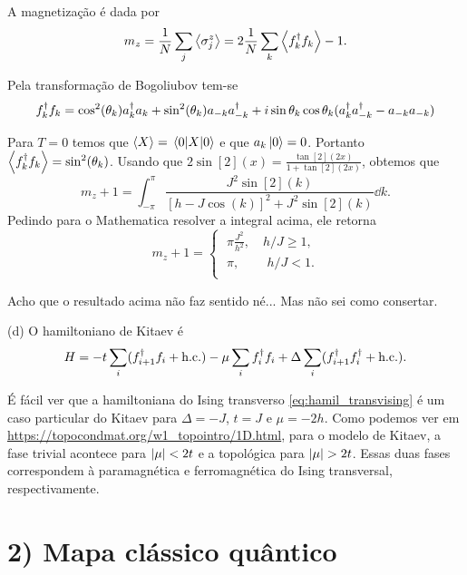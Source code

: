 \documentclass[a4paper,10pt]{article}
\begin{document}
\n

A magnetização é dada por
$$
m_z = \frac{1}{N} \sum_{j} \ev{\s_j^z} = 2 \frac{1}{N}\sum_{k} \ev{f_k^\d f_k} - 1.
$$

Pela transformação de Bogoliubov tem-se
$$
f_k^\dagger f_k = \cos[2](\theta_k) a_k^\dagger a_k + \sin[2](\theta_k) a_{-k}a_{-k}^\dagger
+ i \sin\theta_k \cos\theta_k (a_{k}^\dagger a_{-k}^\dagger - a_{-k} a_{-k})
$$

Para $T = 0$ temos que $\ev{X} = \ev{X}{0}$ e que $a_k \ket{0} = 0$. Portanto $\ev{f_k^\d f_k} = \sin[2](\theta_k)$. Usando que $2 \sin[2](x) = \frac{\tan[2](2x)}{1 + \tan[2](2x)}$, obtemos que
$$
m_z + 1 = \int_{-\pi}^{\pi} \frac{J^2 \sin[2](k)}{[h-J\cos(k)]^2 + J^2\sin[2](k)} \dd{k}.
$$
Pedindo para o Mathematica resolver a integral acima, ele retorna
$$
m_z + 1 =
\begin{cases}
\; \pi \frac{J^2}{h^2} , \quad h/J \geq 1, \\
\; \pi , \quad \quad \, h/J < 1. \\
\end{cases}
$$

Acho que o resultado acima não faz sentido né... Mas não sei como consertar.

\n

(d) O hamiltoniano de Kitaev é
$$
H = -t \sum_{i} (f_{i+1}^\dagger f_i + \text{h.c.}) - \mu \sum_{i} f_i^\dagger f_i
+ \Delta \sum_{i} (f_{i+1}^\dagger f_i^\dagger + \text{h.c.}).
$$

É fácil ver que a hamiltoniana do Ising transverso \ref{eq:hamil_transvising} é um caso particular do Kitaev para $\Delta = -J$, $t = J$ e $\mu = -2h$. Como podemos ver em \url{https://topocondmat.org/w1_topointro/1D.html}, para o modelo de Kitaev, a fase trivial acontece para $\abs{\mu} < 2t$ e a topológica para $\abs{\mu} > 2t$. Essas duas fases correspondem à paramagnética e ferromagnética do Ising transversal, respectivamente.

\n\n

\section*{2) Mapa clássico quântico}




%


\end{document}
